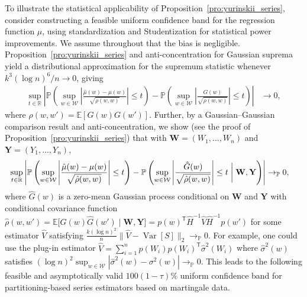 \documentclass[11pt,lof]{puthesis}
\renewcommand{\P}{\ensuremath{\mathbb{P}}}
\newcommand{\R}{\ensuremath{\mathbb{R}}}
\newcommand{\E}{\ensuremath{\mathbb{E}}}
\newcommand{\bW}{\ensuremath{\mathbf{W}}}
\newcommand{\bY}{\ensuremath{\mathbf{Y}}}
\newcommand{\cW}{\ensuremath{\mathcal{W}}}
\newcommand{\T}{\ensuremath{\mathsf{T}}}
\DeclareMathOperator{\Var}{Var}
\theoremstyle{break}
\theoremstyle{proof}
\begin{document}
To illustrate the statistical applicability of
Proposition~\ref{pro:yurinskii_series}, consider constructing a feasible uniform
confidence band for the regression function $\mu$, using standardization and
Studentization for statistical power improvements. We assume throughout that
the bias is negligible. Proposition~\ref{pro:yurinskii_series} and
anti-concentration for
Gaussian suprema \citep[Corollary~2.1]{chernozhukov2014anti} yield
a distributional approximation for the supremum statistic whenever
$k^3(\log n)^6 / n \to 0$, giving
%
\begin{align*}
  \sup_{t \in \R}
  \left|
  \P\left(
    \sup_{w \in \cW}
    \left|
    \frac{\hat\mu(w)-\mu(w)}{\sqrt{\rho(w,w)}}
    \right| \leq t
  \right)
  -
  \P\left(
    \sup_{w \in \cW}
    \left|
    \frac{G(w)}{\sqrt{\rho(w,w)}}
    \right| \leq t
  \right)
  \right|
  &\to 0,
\end{align*}
%
where $\rho(w,w') = \E[G(w)G(w')]$. Further, by a Gaussian--Gaussian
comparison result \citep[Lemma~3.1]{chernozhukov2013gaussian} and
anti-concentration, we show (see the proof of
Proposition~\ref{pro:yurinskii_series}) that with $\bW = (W_1, \ldots, W_n)$
and $\bY = (Y_1, \ldots, Y_n)$,
%
\begin{align*}
  \sup_{t \in \R}
  \left|
  \P\left(
    \sup_{w \in \cW}
    \left|
    \frac{\hat\mu(w)-\mu(w)}{\sqrt{\hat\rho(w,w)}}
    \right| \leq t
  \right)
  - \P\left(
    \sup_{w \in \cW}
    \left|
    \frac{\hat G(w)}{\sqrt{\hat\rho(w,w)}}
    \right| \leq t \biggm| \bW, \bY
  \right)
  \right|
  &\to_\P 0,
\end{align*}
%
where $\hat G(w)$ is a zero-mean Gaussian process
conditional on $\bW$ and $\bY$ with conditional covariance function
$\hat\rho(w,w')
=\E\big[\hat G(w) \hat G(w') \mid \bW, \bY \big]
= p(w)^\T \hat H^{-1} \hat V \hat H^{-1}p(w')$
for some estimator $\hat V$ satisfying
$\frac{k (\log n)^2}{n}
\big\|\hat V-\Var[S]\big\|_2 \to_\P 0$.
For example, one could use the plug-in estimator
$\hat V=\sum_{i=1}^n p(W_i) p(W_i)^\T \hat{\sigma}^2(W_i)$
where $\hat{\sigma}^2(w)$ satisfies
$(\log n)^2 \sup_{w \in \cW}
|\hat{\sigma}^2(w)-\sigma^2(w)| \to_\P 0$.
This leads to the following feasible and asymptotically valid
$100(1-\tau)\%$
uniform confidence band for partitioning-based series estimators
based on martingale data.
\end{document}
